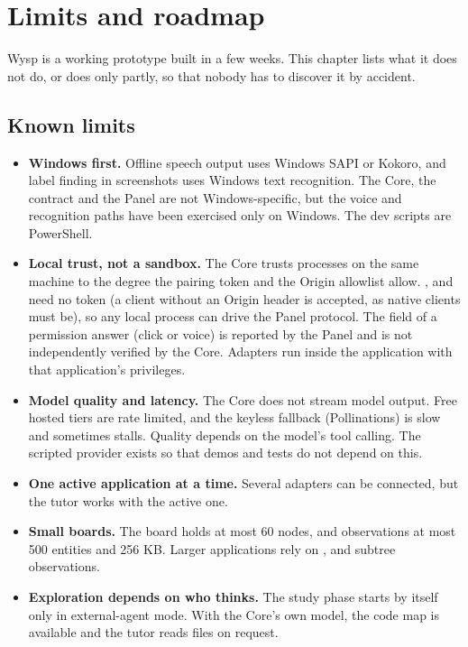 ﻿\section{Limits and roadmap}\label{sec:limits}

Wysp is a working prototype built in a few weeks. This chapter lists what it does not do, or does only partly, so that nobody has to discover it by accident.

\subsection{Known limits}

\begin{itemize}[leftmargin=1.2em]
  \item \textbf{Windows first.} Offline speech output uses Windows SAPI or Kokoro, and label finding in screenshots uses Windows text recognition. The Core, the contract and the Panel are not Windows-specific, but the voice and recognition paths have been exercised only on Windows. The dev scripts are PowerShell.
  \item \textbf{Local trust, not a sandbox.} The Core trusts processes on the same machine to the degree the pairing token and the Origin allowlist allow. ,  and  need no token (a client without an Origin header is accepted, as native clients must be), so any local process can drive the Panel protocol. The  field of a permission answer (click or voice) is reported by the Panel and is not independently verified by the Core. Adapters run inside the application with that application's privileges.
  \item \textbf{Model quality and latency.} The Core does not stream model output. Free hosted tiers are rate limited, and the keyless fallback (Pollinations) is slow and sometimes stalls. Quality depends on the model's tool calling. The scripted provider exists so that demos and tests do not depend on this.
  \item \textbf{One active application at a time.} Several adapters can be connected, but the tutor works with the active one.
  \item \textbf{Small boards.} The board holds at most 60 nodes, and observations at most 500 entities and 256 KB. Larger applications rely on ,  and subtree observations.
  \item \textbf{Exploration depends on who thinks.} The study phase starts by itself only in external-agent mode. With the Core's own model, the code map is available and the tutor reads files on request.

\end{itemize}
